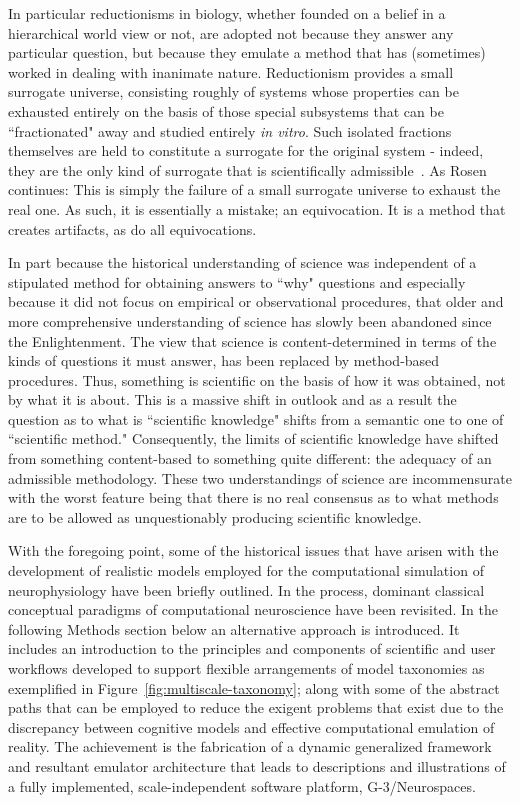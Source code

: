 \documentclass[11pt,3p,twocolumn]{JMN}
\begin{document}
In particular reductionisms in biology, whether founded on a belief in a hierarchical world view or not, are adopted not because they answer any particular question, but because they emulate a method that has (sometimes) worked in dealing with inanimate nature. Reductionism provides a small surrogate universe, consisting roughly of systems whose properties can be exhausted entirely on the basis of those special subsystems that can be ``fractionated" away and studied entirely \textit{in vitro}. Such isolated fractions themselves are held to constitute a surrogate for the original system - indeed, they are the only kind of surrogate that is scientifically admissible~\citep{rosen96}. As Rosen continues: This is simply the failure of a small surrogate universe to exhaust the real one. As such, it is essentially a mistake; an equivocation. It is a method that creates artifacts, as do all equivocations.

In part because the historical understanding of science was independent of a stipulated method for obtaining answers to ``why" questions and especially because it did not focus on empirical or observational procedures, that older and more comprehensive understanding of science has slowly been abandoned since the Enlightenment. The view that science is content-determined in terms of the kinds of questions it must answer, has been replaced by method-based procedures. Thus, something is scientific on the basis of how it was obtained, not by what it is about. This is a massive shift in outlook and as a result the question as to what is ``scientific knowledge" shifts from a semantic one to one of ``scientific method." Consequently, the limits of scientific knowledge have shifted from something content-based to something quite different: the adequacy of an admissible methodology. These two understandings of science are incommensurate with the worst feature being that there is no real consensus as to what methods are to be allowed as unquestionably producing scientific knowledge.

With the foregoing point, some of the historical issues that have arisen with the development of realistic models employed for the computational simulation of neurophysiology have been briefly outlined. In the process, dominant classical conceptual paradigms of computational neuroscience have been revisited. In the following Methods section below an alternative approach is introduced. It includes an introduction to the principles and components of scientific and user workflows developed to support flexible arrangements of model taxonomies as exemplified in Figure~\ref{fig:multiscale-taxonomy}; along with some of the abstract paths that can be employed to reduce the exigent problems that exist due to the discrepancy between  cognitive models and effective computational emulation of reality. The achievement is the fabrication of a dynamic generalized framework and resultant emulator architecture that leads to descriptions and illustrations of a fully implemented, scale-independent software platform, G-3/Neurospaces.
\end{document}
